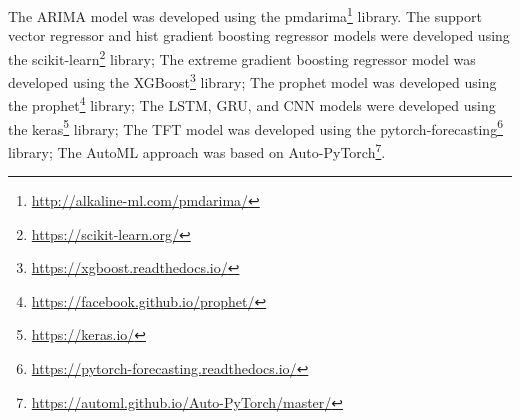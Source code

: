 The ARIMA model was developed using the pmdarima\footnote{ \url{http://alkaline-ml.com/pmdarima/} } library.
The support vector regressor and hist gradient boosting regressor models were developed using the scikit-learn\footnote{ \url{https://scikit-learn.org/} } library;
The extreme gradient boosting regressor model was developed using the XGBoost\footnote{ \url{https://xgboost.readthedocs.io/} } library;
The prophet model was developed using the prophet\footnote{ \url{https://facebook.github.io/prophet/} } library;
The LSTM, GRU, and CNN models were developed using the keras\footnote{ \url{https://keras.io/} } library;
The TFT model was developed using the pytorch-forecasting\footnote{ \url{https://pytorch-forecasting.readthedocs.io/} } library;
The AutoML approach was based on Auto-PyTorch\footnote{ \url{https://automl.github.io/Auto-PyTorch/master/} }.
